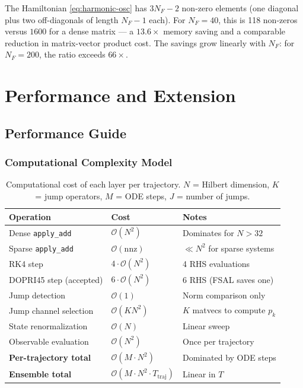 \documentclass[11pt,a4paper,twoside]{book}
\newcommand{\Order}{\mathcal{O}}
\newcommand{\code}[1]{\texttt{\small#1}}
\theoremstyle{definition}
\theoremstyle{remark}
\begin{document}
\begin{perfbox}
  The Hamiltonian \cref{eq:harmonic-osc} has $3N_F - 2$ non-zero elements
  (one diagonal plus two off-diagonals of length $N_F - 1$ each).
  For $N_F = 40$, this is 118 non-zeros versus $1600$ for a dense
  matrix --- a $13.6\times$ memory saving and a comparable
  reduction in matrix-vector product cost. The savings grow linearly
  with $N_F$: for $N_F = 200$, the ratio exceeds $66\times$.
\end{perfbox}

\part{Performance and Extension}

\chapter{Performance Guide}
\label{chap:performance}

\section{Computational Complexity Model}
\label{sec:complexity}

\begin{table}[H]
\centering
\caption{Computational cost of each layer per trajectory.
         $N$ = Hilbert dimension, $K$ = jump operators, $M$ = ODE steps,
         $J$ = number of jumps.}
\label{tab:complexity}
\begin{tabularx}{\linewidth}{L{30mm}L{25mm}X}
\toprule
\textbf{Operation} & \textbf{Cost} & \textbf{Notes} \\
\midrule
Dense \code{apply\_add}  & $\Order(N^2)$  & Dominates for $N > 32$ \\
Sparse \code{apply\_add} & $\Order(\mathrm{nnz})$ & $\ll N^2$ for sparse systems \\
RK4 step                 & $4 \cdot \Order(N^2)$ & 4 RHS evaluations \\
DOPRI45 step (accepted)  & $6 \cdot \Order(N^2)$ & 6 RHS (FSAL saves one) \\
Jump detection           & $\Order(1)$    & Norm comparison only \\
Jump channel selection   & $\Order(KN^2)$ & $K$ matvecs to compute $p_k$ \\
State renormalization    & $\Order(N)$    & Linear sweep \\
Observable evaluation    & $\Order(N^2)$  & Once per trajectory \\
\midrule
\textbf{Per-trajectory total} & $\Order(M \cdot N^2)$ & Dominated by ODE steps \\
\textbf{Ensemble total}       & $\Order(M \cdot N^2 \cdot T_{\mathrm{traj}})$ & Linear in $T$ \\
\bottomrule
\end{tabularx}
\end{table}
\end{document}
